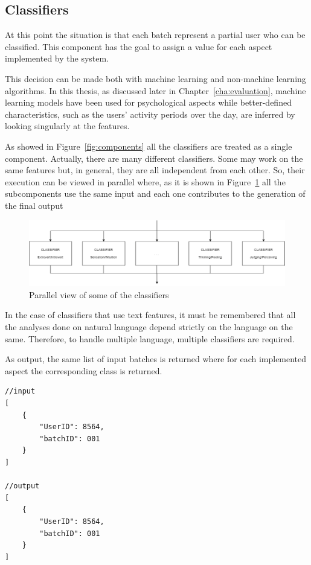 \subsection{Classifiers}
At this point the situation is that each batch represent a partial user who can be classified. 
This component has the goal to assign a value for each aspect implemented by the system.

This decision can be made both with machine learning and non-machine learning algorithms.
In this thesis, as discussed later in Chapter~\ref{cha:evaluation}, machine learning models have been used for psychological aspects while better-defined characteristics, such as the users' activity periods over the day, are inferred by looking singularly at the features.

As showed in Figure~\ref{fig:components} all the classifiers are treated as a single component. Actually, there are many different classifiers.
Some may work on the same features but, in general, they are all independent from each other.
So, their execution can be viewed in parallel where, as it is shown in Figure~\ref{fig:classifiers} all the subcomponents use the same input and each one contributes to the generation of the final output

\begin{figure}[htp]
    \centering
    \includegraphics[width=%
    1.0\textwidth,keepaspectratio]{img/classifiers}
    \caption{Parallel view of some of the classifiers}
    \label{fig:classifiers}
\end{figure}

In the case of classifiers that use text features, it must be remembered that all the analyses done on natural language depend strictly on the language on the same.
Therefore, to handle multiple language, multiple classifiers are required.

As output, the same list of input batches is returned where for each implemented aspect the corresponding class is returned.

\begin{multicols}{2}
\begin{verbatim}
//input
[
    {
        "UserID": 8564,
        "batchID": 001
    }
]
            
//output
[
    {
        "UserID": 8564,
        "batchID": 001
    }
]
\end{verbatim}
\end{multicols}

